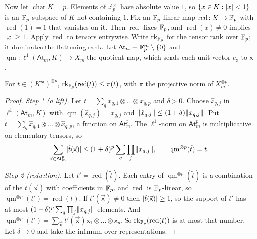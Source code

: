 Now let $\operatorname{char}K=p$. Elements of $\mathbb F_p^\times$ have absolute value $1$, so $\{x\in K:\lvert x\rvert<1\}$ is an $\mathbb F_p$\nobreakdash-subspace of $K$ not containing $1$. Fix an $\mathbb F_p$\nobreakdash-linear map $\operatorname{red}\colon K\to\mathbb F_p$ with $\operatorname{red}(1)=1$ that vanishes on it. Then $\operatorname{red}$ fixes $\mathbb F_p$, and $\operatorname{red}(x)\ne0$ implies $\lvert x\rvert\ge1$. Apply $\operatorname{red}$ to tensors entrywise. Write $\operatorname{rk}_{\mathbb F_p}$ for the tensor rank over $\mathbb F_p$; it dominates the flattening rank. Let $\mathsf{At}_m=\mathbb F_p^m\setminus\{0\}$ and $\operatorname{qm}\colon\ell^1(\mathsf{At}_m,K)\to X_m$ the quotient map, which sends each unit vector $e_{\mathsf x}$ to $\mathsf x$.

\begin{lemma}\label{amb:lem:reduction}
For $t\in(K^m)^{\otimes p}$, $\operatorname{rk}_{\mathbb F_p}(\operatorname{red}(t))\le\pi(t)$, with $\pi$ the projective norm of $X_m^{\otimes p}$.
\end{lemma}

\begin{proof}
\emph{Step 1 (a lift).} Let $t=\sum_qx_{q,1}\otimes\dots\otimes x_{q,p}$ and $\delta>0$. Choose $\hat x_{q,j}$ in $\ell^1(\mathsf{At}_m,K)$ with $\operatorname{qm}(\hat x_{q,j})=x_{q,j}$ and $\lVert \hat x_{q,j}\rVert\le(1+\delta)\lVert x_{q,j}\rVert$. Put $\tilde t=\sum_q\hat x_{q,1}\otimes\dots\otimes\hat x_{q,p}$, a function on $\mathsf{At}_m^p$. The $\ell^1$-norm on $\mathsf{At}_m^p$ is multiplicative on elementary tensors, so
\[
 \sum_{\vec{\mathsf x}\in\mathsf{At}_m^p}\lvert \tilde t(\vec{\mathsf x})\rvert\le(1+\delta)^p\sum_q\prod_j\lVert x_{q,j}\rVert,\qquad\operatorname{qm}^{\otimes p}(\tilde t)=t.
\]

\emph{Step 2 (reduction).} Let $t'=\operatorname{red}(\tilde t)$. Each entry of $\operatorname{qm}^{\otimes p}(\tilde t)$ is a combination of the $\tilde t(\vec{\mathsf x})$ with coefficients in $\mathbb F_p$, and $\operatorname{red}$ is $\mathbb F_p$\nobreakdash-linear, so $\operatorname{qm}^{\otimes p}(t')=\operatorname{red}(t)$. If $t'(\vec{\mathsf x})\ne0$ then $\lvert \tilde t(\vec{\mathsf x})\rvert\ge1$, so the support of $t'$ has at most $(1+\delta)^p\sum_q\prod_j\lVert x_{q,j}\rVert$ elements. And $\operatorname{qm}^{\otimes p}(t')=\sum_{\vec{\mathsf x}}t'(\vec{\mathsf x})\,\mathsf x_1\otimes\dots\otimes\mathsf x_p$. So $\operatorname{rk}_{\mathbb F_p}(\operatorname{red}(t))$ is at most that number. Let $\delta\to0$ and take the infimum over representations.
\end{proof}

